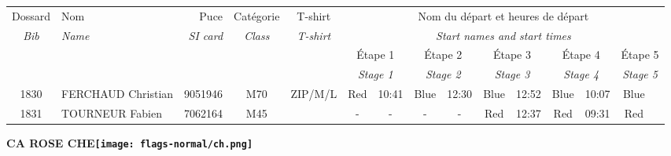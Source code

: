 \documentclass{report}
\begin{document}
  \begin{longtable}{|c|l|r|c|c|*{5}{cc|}}
    Dossard & Nom  & Puce    & Catégorie & T-shirt & \multicolumn{10}{c|}{Nom du départ et heures de départ} \\
    \itshape Bib     & \itshape Name & \itshape SI card & \itshape Class  & \itshape  T-shirt  & \multicolumn{10}{c|}{\itshape Start names and start times} \\
    \hline
    & & & & & \multicolumn{2}{c|}{Étape 1} & \multicolumn{2}{c|}{Étape 2} & \multicolumn{2}{c|}{Étape 3} & \multicolumn{2}{c|}{Étape 4} & \multicolumn{2}{c|}{Étape 5} \\
    & & & & & \multicolumn{2}{c|}{\itshape Stage 1} & \multicolumn{2}{c|}{\itshape Stage 2} & \multicolumn{2}{c|}{\itshape Stage 3} & \multicolumn{2}{c|}{\itshape Stage 4} & \multicolumn{2}{c|}{\itshape Stage 5} \\
    \hline
    1830 & FERCHAUD Christian & 9051946 & M70 & ZIP/M/L & Red & 10:41 & Blue & 12:30 & Blue & 12:52 & Blue & 10:07 & Blue &  \\
    1831 & TOURNEUR Fabien & 7062164 & M45 &   & - &  - & - &  - & Red & 12:37 & Red & 09:31 & Red &  \\
  \end{longtable}
\newpage
  \Huge \centering \bfseries CA ROSE  CHE\normalfont \footnotesize \sffamily \hfill \texttt{[image: flags-normal/ch.png]} \newline 
\end{document}
